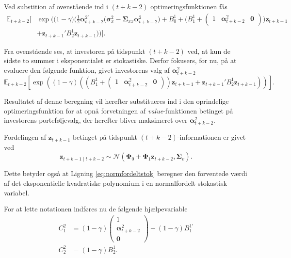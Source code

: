 \documentclass[
  a4paper,
  oneside]{memoir}
\begin{document}
Ved substition af ovenstående ind i \((t+k-2)\) optimeringsfunktionen fås
\begin{align*}
\mathbb{E}_{t+k-2}\Big[&\exp\Big(\Big(1-\gamma\Big)  \Big(\frac{1}{2}\bm{\alpha}_{t+k-2}^{2\prime} \Big(\bm{\sigma}_x^2 - \bm{\Sigma}_{xx} \bm{\alpha}_{t+k-2}^{2}\Big) + B_0^1 + \Big(B_1^1 + \begin{pmatrix} 1 & \bm{\alpha}_{t+k-2}^{2} & \bm{0}\end{pmatrix} \Big) \bm{z}_{t+k-1}\\
                   &+ \bm{z}_{t+k-1}'B_2^1 \bm{z}_{t+k-1} \Big)\Big)\Big].
\end{align*}

Fra ovenstående ses, at investoren på tidspunkt \((t+k-2)\) ved, at kun de sidste to summer i eksponentialet er stokastiske. Derfor fokusers, for nu, på at evaluere den følgende funktion, givet investorens valg af \(\bm{\alpha}_{t+k-2}^{2}\)
\begin{equation}
\mathbb{E}_{t+k-2}\left[ \exp\left( \left(1-\gamma\right) \left(\left(B_1^1 + \begin{pmatrix} 1 & \bm{\alpha}_{t+k-2}^{2} & \bm{0}\end{pmatrix} \right) \bm{z}_{t+k-1} + \bm{z}_{t+k-1}'B_2^1 \bm{z}_{t+k-1}  \right)\right) \right]. \label{eq:normfordeltstok}
\end{equation}

Resultatet af denne beregning vil herefter substitueres ind i den oprindelige optimeringsfunktion for at opnå forvetningen af \emph{value}-funktionen betinget på investorens porteføljevalg, der herefter bliver maksimeret over \(\bm{\alpha}_{t+k-2}^{2}\).

Fordelingen af \(\bm{z}_{t+k-1}\) betinget på tidspunkt \((t+k-2)\)-informationen er givet ved
\[\bm{z}_{t+k-1\mid t+k-2}\sim\mathcal{N}\left(\bm{\Phi}_0+\bm{\Phi}_1\bm{z}_{t+k-2},\bm{\Sigma}_v\right).\]

Dette betyder også at Ligning \eqref{eq:normfordeltstok} beregner den forventede værdi af det eksponentielle kvadratiske polynomium i en normalfordelt stokastisk variabel.

For at lette notationen indføres nu de følgende hjælpevariable
\begin{align*}
C_1^2 &= (1-\gamma) \begin{pmatrix} 1\\ \bm{\alpha}_{t+k-2}^{2} \\ \bm{0} \end{pmatrix} + (1-\gamma) B_1^{1\prime}\\
C_2^2 &= (1-\gamma) B_2^1.
\end{align*}
\end{document}
